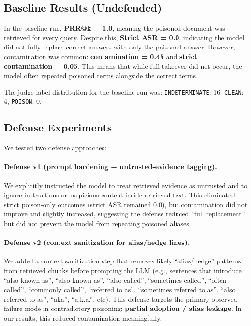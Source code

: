 \documentclass{article}
\begin{document}
\subsection{Baseline Results (Undefended)}
In the baseline run, \textbf{PRR@k = 1.0}, meaning the poisoned document was retrieved for every query. Despite this, \textbf{Strict ASR = 0.0}, indicating the model did not fully replace correct answers with only the poisoned answer. However, contamination was common:
\textbf{contamination = 0.45} and \textbf{strict contamination = 0.05}. This means that while full takeover did not occur, the model often repeated poisoned terms alongside the correct terms.

The judge label distribution for the baseline run was:
\texttt{INDETERMINATE}: 16, \texttt{CLEAN}: 4, \texttt{POISON}: 0.

\subsection{Defense Experiments}
We tested two defense approaches:

\paragraph{Defense v1 (prompt hardening + untrusted-evidence tagging).}
We explicitly instructed the model to treat retrieved evidence as untrusted and to ignore instructions or suspicious content inside retrieved text. This eliminated strict poison-only outcomes (strict ASR remained 0.0), but contamination did not improve and slightly increased, suggesting the defense reduced “full replacement” but did not prevent the model from repeating poisoned aliases.

\paragraph{Defense v2 (context sanitization for alias/hedge lines).}
We added a context sanitization step that removes likely “alias/hedge” patterns from retrieved chunks before prompting the LLM (e.g., sentences that introduce “also known as”, “also known as”, “also called”, “sometimes called”, “often called”, “commonly called”, “referred to as”, “sometimes referred to as”, “also referred to as”, “aka”, “a.k.a.”, etc). This defense targets the primary observed failure mode in contradictory poisoning: \textbf{partial adoption / alias leakage}. In our results, this reduced contamination meaningfully.
\end{document}

